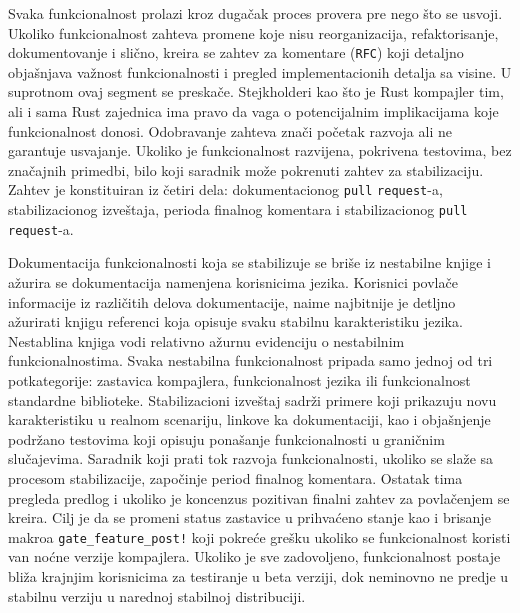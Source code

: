 \documentclass[11pt]{article}
\begin{document}
Svaka funkcionalnost prolazi kroz dugačak proces provera pre nego 
što se usvoji. Ukoliko funkcionalnost zahteva promene koje nisu reorganizacija, refaktorisanje, dokumentovanje
i slično, kreira se zahtev za komentare (\verb|RFC|) koji detaljno objašnjava važnost funkcionalnosti i 
pregled implementacionih detalja sa visine. U suprotnom ovaj segment se preskače. Stejkholderi kao što je Rust kompajler tim, ali i sama Rust zajednica 
ima pravo da vaga o potencijalnim implikacijama koje funkcionalnost donosi. Odobravanje zahteva znači početak 
razvoja ali ne garantuje usvajanje. Ukoliko je funkcionalnost razvijena, pokrivena testovima, 
bez značajnih primedbi, bilo koji saradnik može pokrenuti zahtev za stabilizaciju. Zahtev je konstituiran iz 
četiri dela: dokumentacionog \verb|pull| \verb|request|-a, stabilizacionog izveštaja, 
perioda finalnog komentara i stabilizacionog \verb|pull| \verb|request|-a.

Dokumentacija funkcionalnosti koja se stabilizuje se briše iz nestabilne knjige \cite{unstable} i ažurira se 
dokumentacija namenjena korisnicima jezika. Korisnici povlače informacije iz različitih delova dokumentacije,
naime najbitnije je detljno ažurirati knjigu referenci \cite{rust-reference} koja opisuje svaku stabilnu 
karakteristiku jezika. Nestablina knjiga vodi relativno ažurnu evidenciju o nestabilnim funkcionalnostima.
Svaka nestabilna funkcionalnost pripada samo jednoj od tri potkategorije: zastavica kompajlera, funkcionalnost jezika ili
funkcionalnost standardne biblioteke. Stabilizacioni izveštaj sadrži primere koji prikazuju novu karakteristiku 
u realnom scenariju, linkove ka dokumentaciji, kao i objašnjenje podržano testovima koji opisuju ponašanje funkcionalnosti u 
graničnim slučajevima. Saradnik koji prati tok razvoja funkcionalnosti, ukoliko se slaže sa procesom 
stabilizacije, započinje period finalnog komentara. Ostatak tima pregleda predlog i ukoliko je koncenzus
pozitivan finalni zahtev za povlačenjem se kreira. Cilj je da se promeni status zastavice u prihvaćeno
stanje kao i brisanje makroa \verb|gate_feature_post!| koji pokreće grešku ukoliko se funkcionalnost koristi van noćne verzije kompajlera.
Ukoliko je sve zadovoljeno, funkcionalnost postaje bliža krajnjim korisnicima za testiranje u beta verziji, dok
neminovno ne predje u stabilnu verziju u narednoj stabilnoj distribuciji. 

\newpage
\end{document}
